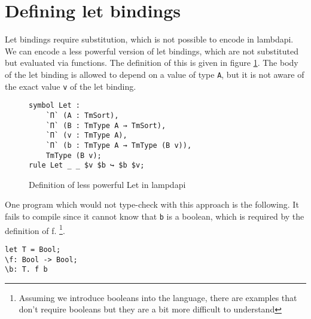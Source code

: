 \section{\label{ch:comp-lambdapi:let}Defining let bindings}

Let bindings require substitution, which is not possible to encode in lambdapi. We can encode a less powerful version of let bindings, which are not substituted but evaluated via functions. The definition of this is given in figure \ref{fig:lp-let}. The body of the let binding is allowed to depend on a value of type \verb|A|, but it is not aware of the exact value \verb|v| of the let binding. 

\begin{figure}[ht]
	\begin{lstlisting}
symbol Let : 
	`Π` (A : TmSort), 
	`Π` (B : TmType A → TmSort), 
	`Π` (v : TmType A),
	`Π` (b : TmType A → TmType (B v)),
	TmType (B v);
rule Let _ _ $v $b ↪ $b $v;
	\end{lstlisting}
	\caption{Definition of less powerful Let in lampdapi}
	\label{fig:lp-let}
\end{figure}

One program which would not type-check with this approach is the following. It fails to compile since it cannot know that \verb|b| is a boolean, which is required by the definition of f. \footnote{Assuming we introduce booleans into the language, there are examples that don't require booleans but they are a bit more difficult to understand}.
\begin{lstlisting}
let T = Bool;
\f: Bool -> Bool;
\b: T. f b
\end{lstlisting}

